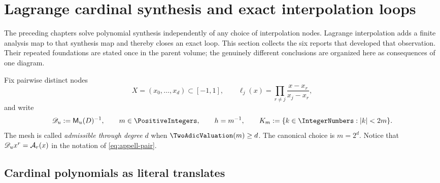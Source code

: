 
\newcommand{\AugmentedEvaluationMatrix}{\widehat U}
\newcommand{\AugmentedCoefficientMatrix}{\widehat B}
\newcommand{\OmittedMatrixIndex}[1]{\widehat{#1}}
\newcommand{\LiftedCoefficientProjector}[2]{\widehat{\mathcal P}_{#1}^{(#2)}}
\newcommand{\LiftedCoefficientDetail}[2]{\widehat\Delta_{#1}^{(#2)}}

\section{Lagrange cardinal synthesis and exact interpolation loops}
\label{sec:lagrange-loops}

The preceding chapters solve polynomial synthesis independently of any
choice of interpolation nodes.  Lagrange interpolation adds a finite analysis
map to that synthesis map and thereby closes an exact loop.  This section
collects the six reports that developed that observation.  Their repeated
foundations are stated once in the parent volume; the genuinely different
conclusions are organized here as consequences of one diagram.

Fix pairwise distinct nodes
\[
 X=(x_0,\ldots,x_d)\subset[-1,1],
 \qquad
 \ell_j(x)=\prod_{r\ne j}\frac{x-x_r}{x_j-x_r},
\]
and write
\[
 \mathscr D_u:=\MM_u(D)^{-1},\qquad
 m\in\PositiveIntegers,\qquad h=m^{-1},\qquad
 K_m:=\{k\in\IntegerNumbers:|k|<2m\}.
\]
The mesh is called \emph{admissible through degree $d$} when
$\TwoAdicValuation(m)\ge d$.  The canonical choice is $m=2^d$.  Notice that
$\mathscr D_u x^r=\mathcal A_r(x)$ in the notation of
\eqref{eq:appell-pair}.

\subsection{Cardinal polynomials as literal translates}

